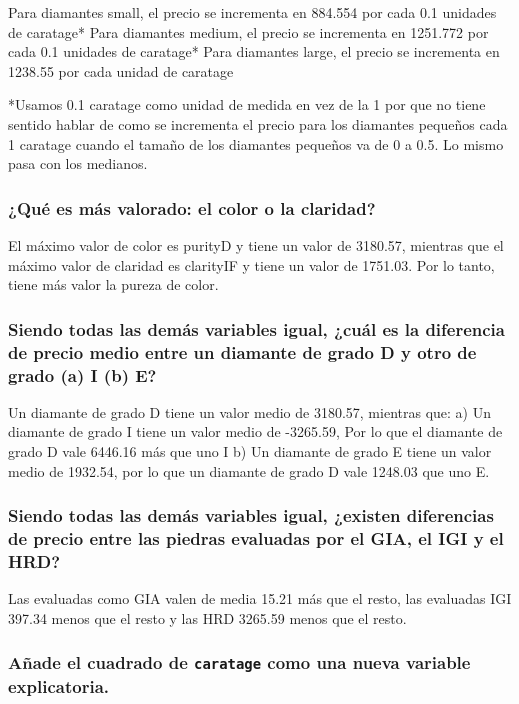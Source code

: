 \documentclass[a4paper, 9pt]{article}
\begin{document}
Para diamantes small, el precio se incrementa en 884.554 por cada 0.1 unidades de caratage*
Para diamantes medium, el precio se incrementa en 1251.772 por cada 0.1 unidades de caratage*
Para diamantes large, el precio se incrementa en 1238.55 por cada unidad de caratage

*Usamos 0.1 caratage como unidad de medida en vez de la 1 por que no tiene sentido hablar de como se incrementa el precio para los diamantes pequeños cada 1 caratage cuando el tamaño de los diamantes pequeños va de 0 a 0.5. Lo mismo pasa con los medianos.


\subsubsection{¿Qué es más valorado: el color o la claridad? }
El máximo valor de color es purityD y tiene un valor de 3180.57, mientras que el máximo valor de claridad es clarityIF y tiene un valor de 1751.03. Por lo tanto, tiene más valor la pureza de color.

\subsubsection{Siendo todas las demás variables igual, ¿cuál es la diferencia de precio medio entre un diamante de grado D y otro de grado (a) I (b) E? }

Un diamante de grado D tiene un valor medio de 3180.57, mientras que:
a) Un diamante de grado I tiene un valor medio de -3265.59, Por lo que el diamante de grado D vale 6446.16 más que uno I
b) Un diamante de grado E tiene un valor medio de 1932.54, por lo que un diamante de grado D vale 1248.03 que uno E.

\subsubsection{Siendo todas las demás variables igual, ¿existen diferencias de precio entre las piedras evaluadas por el GIA, el IGI y el HRD? }

Las evaluadas como GIA valen de media 15.21 más que el resto, las evaluadas IGI 397.34 menos que el resto y las HRD  3265.59 menos que el resto.

\subsubsection{Añade el cuadrado de \texttt{caratage} como una nueva variable explicatoria.}
\end{document}

